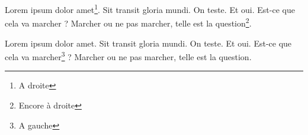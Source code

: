 \documentclass[twoside]{book}
\begin{document}
\begin{pages}


\begin{Rightside}
\beginnumbering
\pstart
Lorem ipsum dolor amet\footnote{\label{droite}A droite}. Sit transit gloria mundi.
On teste. Et oui. Est-ce que cela va marcher ? Marcher ou ne pas marcher, telle est la question\footnote{\label{droiteencore}Encore à droite}.
\pend
\endnumbering
\end{Rightside}

\begin{Leftside}
\beginnumbering
\pstart
Lorem ipsum dolor amet. Sit transit gloria mundi.
On teste. Et oui. Est-ce que cela va marcher\footnote{\label{gauche}A gauche} ? Marcher ou ne pas marcher, telle est la question.
\pend
\endnumbering
\end{Leftside}
\end{pages}

\Pages
\end{document}
